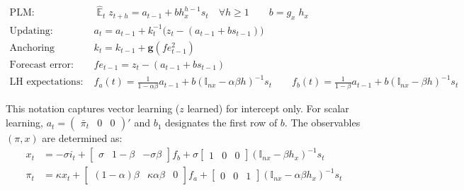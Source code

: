 \documentclass[11pt]{article}
\renewcommand{\[}{\begin{equation}}
\renewcommand{\]}{\end{equation}}
\DeclareMathOperator{\E}{\mathbb{E}}
\begin{document}
\vspace{-1.2cm}

\begin{align}
\text{PLM:} \quad \quad & \hat{\E}_t z_{t+h}  =  a_{t-1} + bh_x^{h-1}s_t  \quad \forall h\geq 1 \quad \quad b = g_x\; h_x \quad \quad  \label{PLM} \\
\text{Updating:} \quad \quad & a_{t}  =a_{t-1} +k_t^{-1}\big(z_{t} -(a_{t-1}+b s_{t-1}) \big)  \\
\text{Anchoring function:} \quad \quad & k_t  = k_{t-1} + \mathbf{g}(fe_{t-1}^2) \\
\text{Forecast error:} \quad \quad & fe_{t-1}  = z_t - (a_{t-1}+b s_{t-1})\\
\text{LH expectations:} \quad \quad & f_a(t) = \frac{1}{1-\alpha\beta}a_{t-1}  + b(\mathbb{I}_{nx} - \alpha\beta h)^{-1}s_t \quad \quad  f_b(t) = \frac{1}{1-\beta}a_{t-1}  + b(\mathbb{I}_{nx} - \beta h)^{-1}s_t  \label{fafb_anal}
\end{align}

\vspace{-0.5cm}

This notation captures vector learning ($z$ learned) for intercept only. For scalar learning, $a_t= \begin{pmatrix} \bar{\pi}_t & 0 & 0\end{pmatrix}' $ and $b_1$ designates the first row of $b$. The observables $(\pi, x)$ are determined as:
\begin{align}
x_t &=  -\sigma i_t + \begin{bmatrix} \sigma & 1-\beta & -\sigma\beta \end{bmatrix} f_b + \sigma \begin{bmatrix} 1 & 0 & 0 \end{bmatrix} (\mathbb{I}_{nx} - \beta h_x)^{-1} s_t \label{A9} \\
\pi_t &= \kappa x_t  + \begin{bmatrix} (1-\alpha)\beta & \kappa\alpha\beta & 0 \end{bmatrix}  f_a + \begin{bmatrix} 0 & 0 & 1 \end{bmatrix}  (\mathbb{I}_{nx} - \alpha \beta h_x)^{-1}  s_t \label{A10}
\end{align}
\end{document}
